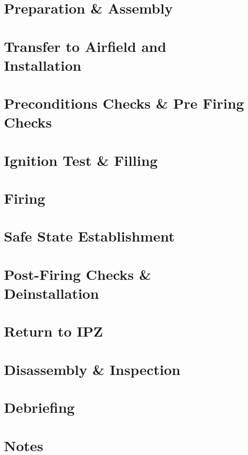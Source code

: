 \documentclass{article}
\begin{document}
\section{Preparation \& Assembly}


\section{Transfer to Airfield and Installation}


\section{Preconditions Checks \& Pre Firing Checks}


\section{Ignition Test \& Filling}


\section{Firing}


\section{Safe State Establishment}


\section{Post-Firing Checks \& Deinstallation}


\section{Return to IPZ}


\section{Disassembly \& Inspection}


\section{Debriefing}

\newpage

\setcounter{section}{0}
\section*{Notes}

\end{document}
